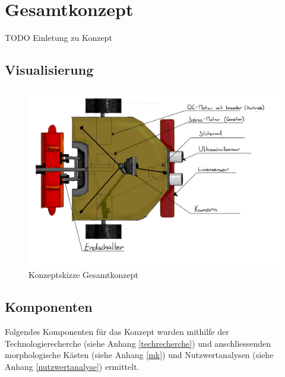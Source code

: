 \section{Gesamtkonzept}

TODO Einletung zu Konzept

\subsection{Visualisierung}

\begin{figure}[H]
\centering
\includegraphics[width=\textwidth]{assets/gesamtkonzept/Skizze-Fahrzeugkonzept-Beschriftet.jpg}
\caption{Konzeptskizze Gesamtkonzept}
\label{fig:robot_concept-scetch_labeld}
\end{figure}


\subsection{Komponenten}

Folgendes Komponenten für das Konzept wurden mithilfe der Technologierecherche (siehe Anhang \ref{techrecherche}) und anschliessenden morphologische Kästen (siehe Anhang \ref{mk}) und Nutzwertanalysen (siehe Anhang \ref{nutzwertanalyse}) ermittelt. 

